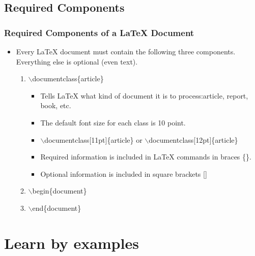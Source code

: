 \documentclass [9pt] {beamer}
\begin{document}
\subsection{Required Components}\label{Required Components}
\begin{frame}\frametitle{Required Components of a LaTeX Document}
\rm
\fontsize{9pt}{11pt}\selectfont
\begin{itemize}
\fontsize{8pt}{10pt}\selectfont

\item Every LaTeX document must contain the following three components. Everything else is optional (even text).\\[.30cm]
\begin{enumerate}
  \item \textcolor[rgb]{0.98,0.00,0.00}{$\backslash$documentclass\{article\}}\\[.30cm]
  \begin{itemize}
    \item Tells LaTeX what kind of document it is to process:article, report, book, etc.\\[.30cm]
    \item The default font size for each class is 10 point.\\[.30cm]
    \item \textcolor[rgb]{0.98,0.00,0.00}{$\backslash$documentclass[11pt]\{article\}} or \textcolor[rgb]{0.98,0.00,0.00}{$\backslash$documentclass[12pt]\{article\}}\\[.30cm]
    \item Required information is included in LaTeX commands in braces \{\}.\\[.30cm]
    \item Optional information is included in square brackets []
  \end{itemize}
  \item \textcolor[rgb]{0.98,0.00,0.00}{$\backslash$begin\{document\}}\\[.30cm]
  \item \textcolor[rgb]{0.98,0.00,0.00}{$\backslash$end\{document\}}\\[.30cm]
\end{enumerate}
\end{itemize}
\end{frame}

\section{Learn by examples}\label{Learn by examples}
\end{document}

